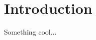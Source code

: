 \documentclass[12pt,a4paper]{article}
\author{}
\date{\today}
\title{}
\begin{document}
\maketitle

\section{Introduction}
Something cool...
\end{document}
